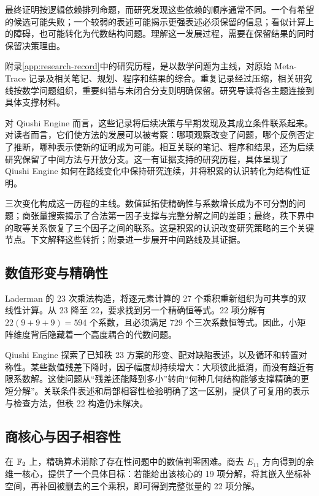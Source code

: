 最终证明按逻辑依赖排列命题，而研究发现这些依赖的顺序通常不同。一个有希望的候选可能失败；一个较弱的表述可能揭示更强表述必须保留的信息；看似计算上的障碍，也可能转化为代数结构问题。理解这一发展过程，需要在保留结果的同时保留决策理由。

附录\ref{app:research-record}中的研究历程，是以数学问题为主线，对原始 Meta-Trace 记录及相关笔记、规划、程序和结果的综合。重复记录经过压缩，相关研究线按数学问题组织，重要纠错与未闭合分支则明确保留。研究导读将各主题连接到具体支撑材料。

对 Qiushi Engine 而言，这些记录将后续决策与早期发现及其成立条件联系起来。对读者而言，它们使方法的发展可以被考察：哪项观察改变了问题，哪个反例否定了推断，哪种表示使新的证明成为可能。相互关联的笔记、程序和结果，还为后续研究保留了中间方法与开放分支。这一有证据支持的研究历程，具体呈现了 Qiushi Engine 如何在路线变化中保持研究连续，并将积累的认识转化为结构性证明。

三次变化构成这一历程的主线。数值延拓使精确性与系数增长成为不可分割的问题；商张量搜索揭示了合法第一因子支撑与完整分解之间的差距；最终，秩下界中的取等关系恢复了三个因子之间的联系。这是积累的认识改变研究策略的三个关键节点。下文解释这些转折；附录进一步展开中间路线及其证据。

\subsection{数值形变与精确性}

Laderman 的 23 次乘法构造，将逐元素计算的 27 个乘积重新组织为可共享的双线性计算\cite{laderman1976noncommutative}。从 23 降至 22，要求找到另一个精确恒等式。22 项分解有 $22(9+9+9)=594$ 个系数，且必须满足 729 个三次系数恒等式。因此，小矩阵维度背后隐藏着一个高度耦合的代数问题。

Qiushi Engine 探索了已知秩 23 方案的形变、配对缺陷表述，以及循环和转置对称性。某些数值残差下降时，因子幅度却持续增大：大项彼此抵消，而没有趋近有限系数解。这使问题从“残差还能降到多小”转向“何种几何结构能够支撑精确的更短分解”。关联条件表述和局部相容性检验明确了这一区别，提供了可复用的表示与检查方法，但秩 22 构造仍未解决。

\subsection{商核心与因子相容性}

在 $\mathbb{F}_2$ 上，精确算术消除了存在性问题中的数值判零困难。商去 $E_{11}$ 方向得到的余维一核心，提供了一个具体目标：若能给出该核心的 19 项分解，将其嵌入坐标补空间，再补回被删去的三个乘积，即可得到完整张量的 22 项分解。

